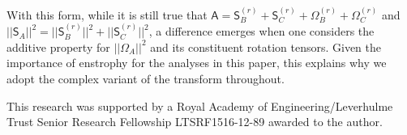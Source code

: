 \documentclass[preprint,amssymb,amsmath,aip,cha]{revtex4-1}
\begin{document}
With this form, while it is still true that $\mathsf{A} = \mathsf{S}^{(r)}_{B} + \mathsf{S}^{(r)}_{C} + \mathsf{\Omega}^{(r)}_{{B}} + \mathsf{\Omega}^{(r)}_{{C}}$ and $||\mathsf{S}_{{A}}||^{2} = ||\mathsf{S}^{(r)}_{{B}}||^{2} + ||\mathsf{S}^{(r)}_{{C}}||^{2}$, a difference emerges when one considers the additive property for $||\mathsf{\Omega}_{{A}}||^{2}$ and its constituent rotation tensors. Given the importance of enstrophy for the analyses in this paper, this explains why we adopt the complex variant of the transform throughout.



\begin{acknowledgements}
This research was supported by a Royal Academy of Engineering/Leverhulme Trust Senior Research Fellowship LTSRF1516-12-89 awarded to the author. %
\end{acknowledgements}
\end{document}
